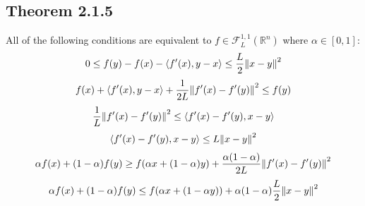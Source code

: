 \documentclass[12pt,a4paper]{article}
\begin{document}
	\subsection*{Theorem 2.1.5}\label{thm215}
	All of the following conditions are equivalent to $f \in \mathcal{F}_L^{1,1}(\mathbb{R}^n)$ where $\alpha \in [0,1]$:
	\begin{equation}\label{thm215_1}
		0 \leq f(y) - f(x) - \langle f'(x), y - x \rangle \leq \frac{L}{2} \norm{x - y}^2
	\end{equation}
	\begin{equation}\label{thm215_2}
		f(x) + \langle f'(x), y - x \rangle + \frac{1}{2L} \norm{f'(x) - f'(y)}^2 \leq f(y)
	\end{equation}
	\begin{equation}\label{thm215_3}
		\frac{1}{L}\norm{f'(x) - f'(y)}^2 \leq \langle f'(x) - f'(y), x - y \rangle 
	\end{equation}
	\begin{equation}\label{thm215_4}
		\langle f'(x) - f'(y), x - y \rangle \leq L \norm{x - y}^2
	\end{equation}
	\begin{equation}\label{thm215_5}
		\alpha f(x) + (1 - \alpha)f(y) \geq f(\alpha x + (1 - \alpha)y) + \frac{\alpha(1 - \alpha)}{2L}\norm{f'(x) - f'(y)}^2
	\end{equation}
	\begin{equation}\label{thm215_6}
		\alpha f(x) + (1- \alpha)f(y) \leq f(\alpha x + (1 - \alpha y)) + \alpha (1 - \alpha)\frac{L}{2}\norm{x - y}^2
	\end{equation}
	
\end{document}
